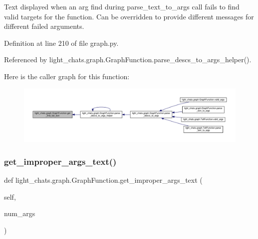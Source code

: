 \begin{DoxyVerb}Text displayed when an arg find during parse_text_to_args call
fails to find valid targets for the function.
Can be overridden to provide different messages for different failed
arguments.
\end{DoxyVerb}
 

Definition at line 210 of file graph.\+py.



Referenced by light\+\_\+chats.\+graph.\+Graph\+Function.\+parse\+\_\+descs\+\_\+to\+\_\+args\+\_\+helper().

Here is the caller graph for this function\+:
\nopagebreak
\begin{figure}[H]
\begin{center}
\leavevmode
\includegraphics[width=350pt]{classlight__chats_1_1graph_1_1GraphFunction_a9c89db357c2eb4c4833d7f975df2e85d_icgraph}
\end{center}
\end{figure}
\mbox{\label{classlight__chats_1_1graph_1_1GraphFunction_a4ffab7ed0e956a6bc76e3f61818ab5ff}} 
\subsubsection{\texorpdfstring{get\+\_\+improper\+\_\+args\+\_\+text()}{get\_improper\_args\_text()}}
{\footnotesize\ttfamily def light\+\_\+chats.\+graph.\+Graph\+Function.\+get\+\_\+improper\+\_\+args\+\_\+text (\begin{DoxyParamCaption}\item[{}]{self,  }\item[{}]{num\+\_\+args }\end{DoxyParamCaption})}



